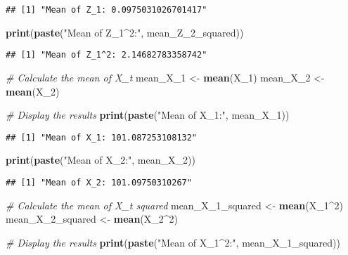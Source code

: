 \documentclass[
]{article}
\newenvironment{Shaded}{\begin{snugshade}}{\end{snugshade}}
\newcommand{\CommentTok}[1]{\textcolor[rgb]{0.56,0.35,0.01}{\textit{#1}}}
\newcommand{\DecValTok}[1]{\textcolor[rgb]{0.00,0.00,0.81}{#1}}
\newcommand{\FunctionTok}[1]{\textcolor[rgb]{0.13,0.29,0.53}{\textbf{#1}}}
\newcommand{\NormalTok}[1]{#1}
\newcommand{\OtherTok}[1]{\textcolor[rgb]{0.56,0.35,0.01}{#1}}
\newcommand{\SpecialCharTok}[1]{\textcolor[rgb]{0.81,0.36,0.00}{\textbf{#1}}}
\newcommand{\StringTok}[1]{\textcolor[rgb]{0.31,0.60,0.02}{#1}}
\begin{document}
\begin{verbatim}
## [1] "Mean of Z_1: 0.0975031026701417"
\end{verbatim}

\begin{Shaded}
\begin{Highlighting}[]
\FunctionTok{print}\NormalTok{(}\FunctionTok{paste}\NormalTok{(}\StringTok{"Mean of Z\_1\^{}2:"}\NormalTok{, mean\_Z\_2\_squared))}
\end{Highlighting}
\end{Shaded}

\begin{verbatim}
## [1] "Mean of Z_1^2: 2.14682783358742"
\end{verbatim}

\begin{Shaded}
\begin{Highlighting}[]
\CommentTok{\# Calculate the mean of X\_t}
\NormalTok{mean\_X\_1 }\OtherTok{\textless{}{-}} \FunctionTok{mean}\NormalTok{(X\_1)}
\NormalTok{mean\_X\_2 }\OtherTok{\textless{}{-}} \FunctionTok{mean}\NormalTok{(X\_2)}

\CommentTok{\# Display the results}
\FunctionTok{print}\NormalTok{(}\FunctionTok{paste}\NormalTok{(}\StringTok{"Mean of X\_1:"}\NormalTok{, mean\_X\_1))}
\end{Highlighting}
\end{Shaded}

\begin{verbatim}
## [1] "Mean of X_1: 101.087253108132"
\end{verbatim}

\begin{Shaded}
\begin{Highlighting}[]
\FunctionTok{print}\NormalTok{(}\FunctionTok{paste}\NormalTok{(}\StringTok{"Mean of X\_2:"}\NormalTok{, mean\_X\_2))}
\end{Highlighting}
\end{Shaded}

\begin{verbatim}
## [1] "Mean of X_2: 101.09750310267"
\end{verbatim}

\begin{Shaded}
\begin{Highlighting}[]
\CommentTok{\# Calculate the mean of X\_t squared}
\NormalTok{mean\_X\_1\_squared }\OtherTok{\textless{}{-}} \FunctionTok{mean}\NormalTok{(X\_1}\SpecialCharTok{\^{}}\DecValTok{2}\NormalTok{)}
\NormalTok{mean\_X\_2\_squared }\OtherTok{\textless{}{-}} \FunctionTok{mean}\NormalTok{(X\_2}\SpecialCharTok{\^{}}\DecValTok{2}\NormalTok{)}

\CommentTok{\# Display the results}
\FunctionTok{print}\NormalTok{(}\FunctionTok{paste}\NormalTok{(}\StringTok{"Mean of X\_1\^{}2:"}\NormalTok{, mean\_X\_1\_squared))}
\end{Highlighting}
\end{Shaded}
\end{document}

